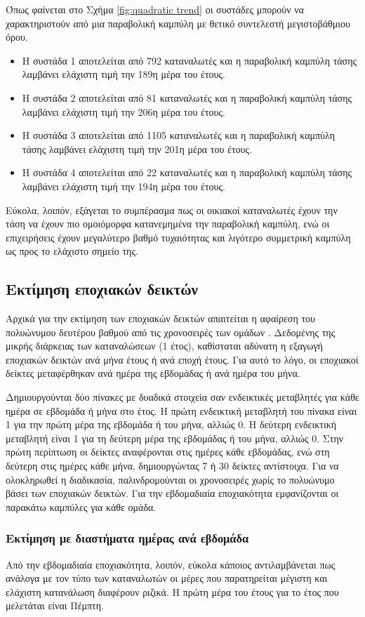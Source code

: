 Όπως φαίνεται στο Σχήμα \ref{fig:quadratic trend} οι συστάδες μπορούν να χαρακτηριστούν από μια παραβολική καμπύλη με θετικό συντελεστή μεγιστοβάθμιου όρου.
\begin{itemize}
\item Η συστάδα 1 αποτελείται από 792 καταναλωτές και η παραβολική καμπύλη τάσης λαμβάνει ελάχιστη τιμή την 189η μέρα του έτους.
\item Η συστάδα 2 αποτελείται από 81 καταναλωτές και η παραβολική καμπύλη τάσης λαμβάνει ελάχιστη τιμή την 206η μέρα του έτους. 
\item Η συστάδα 3 αποτελείται από 1105 καταναλωτές και η παραβολική καμπύλη τάσης λαμβάνει ελάχιστη τιμή την 201η μέρα του έτους.
\item Η συστάδα 4 αποτελείται από 22 καταναλωτές και η παραβολική καμπύλη τάσης λαμβάνει ελάχιστη τιμή την 194η μέρα του έτους.
\end{itemize}

Εύκολα, λοιπόν, εξάγεται το συμπέρασμα πως οι οικιακοί καταναλωτές έχουν την τάση να έχουν πιο ομοιόμορφα κατανεμημένα την παραβολική καμπύλη, ενώ οι επιχειρήσεις έχουν μεγαλύτερο βαθμό τυχαιότητας και λιγότερο συμμετρική καμπύλη ως προς το ελάχιστο σημείο της.
\subsection{Εκτίμηση εποχιακών δεικτών}
Αρχικά για την εκτίμηση των εποχιακών δεικτών απαιτείται η αφαίρεση του πολυώνυμου δευτέρου βαθμού από τις χρονοσειρές των ομάδων \cite{timeseriesanalysis}.  Δεδομένης της μικρής διάρκειας των καταναλώσεων (1 έτος), καθίσταται αδύνατη η εξαγωγή εποχιακών δεικτών ανά μήνα έτους ή ανά εποχή έτους. Για αυτό το λόγο, οι εποχιακοί δείκτες μεταφέρθηκαν ανά ημέρα της εβδομάδας ή ανά ημέρα του μήνα.\par
Δημιουργούνται δύο πίνακες με δυαδικά στοιχεία σαν ενδεικτικές μεταβλητές για κάθε ημέρα σε εβδομάδα ή μήνα στο έτος. Η πρώτη ενδεικτική μεταβλητή του πίνακα είναι 1 για την πρώτη μέρα της εβδομάδα ή του μήνα, αλλιώς 0. Η δεύτερη ενδεικτική μεταβλητή είναι 1 για τη δεύτερη μέρα της εβδομάδας ή του μήνα, αλλιώς 0. Στην πρώτη περίπτωση οι δείκτες αναφέρονται στις ημέρες κάθε εβδομάδας, ενώ στη δεύτερη στις ημέρες κάθε μήνα, δημιουργώντας 7 ή 30 δείκτες αντίστοιχα. Για να ολοκληρωθεί η διαδικασία, παλινδρομούνται οι χρονοσειρές χωρίς το πολυώνυμο βάσει των εποχιακών δεικτών. Για την εβδομαδιαία εποχιακότητα εμφανίζονται οι παρακάτω καμπύλες για κάθε ομάδα.
\subsubsection{Εκτίμηση με διαστήματα ημέρας ανά εβδομάδα}
Από την εβδομαδιαία εποχιακότητα, λοιπόν, εύκολα κάποιος αντιλαμβάνεται πως ανάλογα με τον τύπο των καταναλωτών οι μέρες που παρατηρείται μέγιστη και ελάχιστη κατανάλωση διαφέρουν ριζικά. Η πρώτη μέρα του έτους για το έτος που μελετάται είναι Πέμπτη.\par

